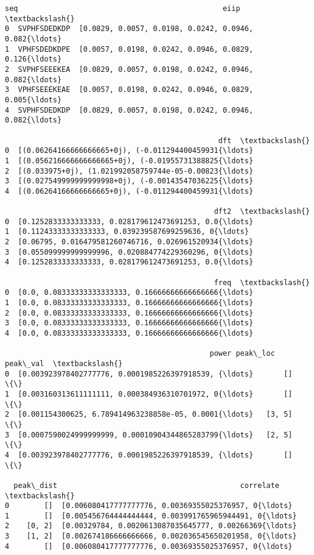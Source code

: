 \documentclass[11pt]{article}
\makeatletter
\newcommand{\boxspacing}{\kern\kvtcb@left@rule\kern\kvtcb@boxsep}
\newcommand{\prompt}[4]{
        \ttfamily\llap{{\color{#2}[#3]:\hspace{3pt}#4}}\vspace{-\baselineskip}
    }
\makeatother
\begin{document}
            \begin{tcolorbox}[breakable, size=fbox, boxrule=.5pt, pad at break*=1mm, opacityfill=0]
\prompt{Out}{outcolor}{208}{\boxspacing}
\begin{Verbatim}[commandchars=\\\{\}]
            seq                                               eiip  \textbackslash{}
0  SVPHFSDEDKDP  [0.0829, 0.0057, 0.0198, 0.0242, 0.0946, 0.082{\ldots}
1  VPHFSDEDKDPE  [0.0057, 0.0198, 0.0242, 0.0946, 0.0829, 0.126{\ldots}
2  SVPHFSEEEKEA  [0.0829, 0.0057, 0.0198, 0.0242, 0.0946, 0.082{\ldots}
3  VPHFSEEEKEAE  [0.0057, 0.0198, 0.0242, 0.0946, 0.0829, 0.005{\ldots}
4  SVPHFSDEDKDP  [0.0829, 0.0057, 0.0198, 0.0242, 0.0946, 0.082{\ldots}

                                                 dft  \textbackslash{}
0  [(0.06264166666666665+0j), (-0.011294400459931{\ldots}
1  [(0.056216666666666665+0j), (-0.01955731388825{\ldots}
2  [(0.033975+0j), (1.021992058759744e-05-0.00823{\ldots}
3  [(0.027549999999999998+0j), (-0.00143547036225{\ldots}
4  [(0.06264166666666665+0j), (-0.011294400459931{\ldots}

                                                dft2  \textbackslash{}
0  [0.1252833333333333, 0.028179612473691253, 0.0{\ldots}
1  [0.11243333333333333, 0.039239587699259636, 0{\ldots}
2  [0.06795, 0.016479581260746716, 0.026961520934{\ldots}
3  [0.055099999999999996, 0.020884774229360296, 0{\ldots}
4  [0.1252833333333333, 0.028179612473691253, 0.0{\ldots}

                                                freq  \textbackslash{}
0  [0.0, 0.08333333333333333, 0.16666666666666666{\ldots}
1  [0.0, 0.08333333333333333, 0.16666666666666666{\ldots}
2  [0.0, 0.08333333333333333, 0.16666666666666666{\ldots}
3  [0.0, 0.08333333333333333, 0.16666666666666666{\ldots}
4  [0.0, 0.08333333333333333, 0.16666666666666666{\ldots}

                                               power peak\_loc peak\_val  \textbackslash{}
0  [0.003923978402777776, 0.0001985226397918539, {\ldots}       []       \{\}
1  [0.003160313611111111, 0.000384936310701972, 0{\ldots}       []       \{\}
2  [0.001154300625, 6.789414963238858e-05, 0.0001{\ldots}   [3, 5]       \{\}
3  [0.0007590024999999999, 0.00010904344865283799{\ldots}   [2, 5]       \{\}
4  [0.003923978402777776, 0.0001985226397918539, {\ldots}       []       \{\}

  peak\_dist                                          correlate  \textbackslash{}
0        []  [0.006080417777777776, 0.00369355025376957, 0{\ldots}
1        []  [0.005456764444444444, 0.003991765965944491, 0{\ldots}
2    [0, 2]  [0.00329784, 0.0020613087035645777, 0.00266369{\ldots}
3    [1, 2]  [0.002674186666666666, 0.002036545650201958, 0{\ldots}
4        []  [0.006080417777777776, 0.00369355025376957, 0{\ldots}


\end{Verbatim}
\end{tcolorbox}
\end{document}
